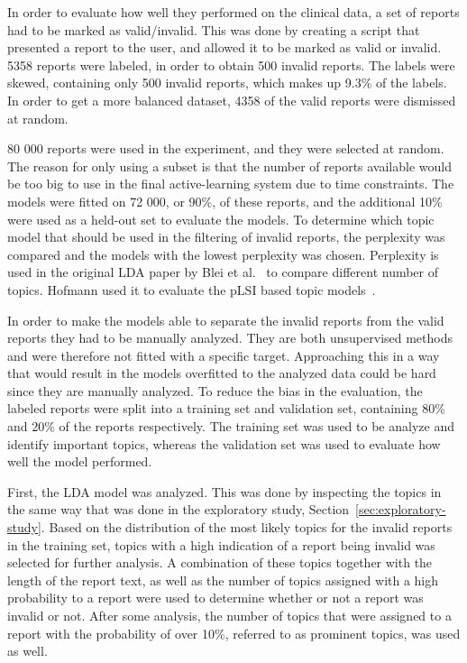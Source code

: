 In order to evaluate how well they performed on the clinical data, a set of reports had to be marked as valid/invalid.
This was done by creating a script that presented a report to the user, and allowed it to be marked as valid or invalid.
5358 reports were labeled, in order to obtain 500 invalid reports.
The labels were skewed, containing only 500 invalid reports, which makes up 9.3\% of the labels.
In order to get a more balanced dataset, 4358 of the valid reports were dismissed at random.

80 000 reports were used in the experiment, and they were selected at random.
The reason for only using a subset is that the number of reports available would be too big to use in the final active-learning system due to time constraints.
The models were fitted on 72 000, or 90\%, of these reports, and the additional 10\% were used as a held-out set to evaluate the models.
To determine which topic model that should be used in the filtering of invalid reports, the perplexity was compared and the models with the lowest perplexity was chosen.
Perplexity is used in the original LDA paper by Blei et al\@.~\cite{blei2003latent} to compare different number of topics.
Hofmann used it to evaluate the pLSI based topic models~\cite{hofmann1999probabilistic}.

In order to make the models able to separate the invalid reports from the valid reports they had to be manually analyzed.
They are both unsupervised methods and were therefore not fitted with a specific target.
Approaching this in a way that would result in the models overfitted to the analyzed data could be hard since they are manually analyzed. 
To reduce the bias in the evaluation, the labeled reports were split into a training set and validation set, containing 80\% and 20\% of the reports respectively.
The training set was used to be analyze and identify important topics, whereas the validation set was used to evaluate how well the model performed.

First, the LDA model was analyzed.
This was done by inspecting the topics in the same way that was done in the exploratory study, Section~\ref{sec:exploratory-study}.
Based on the distribution of the most likely topics for the invalid reports in the training set, topics with a high indication of a report being invalid was selected for further analysis.
A combination of these topics together with the length of the report text, as well as the number of topics assigned with a high probability to a report were used to determine whether or not a report was invalid or not.
After some analysis, the number of topics that were assigned to a report with the probability of over 10\%, referred to as prominent topics, was used as well.

